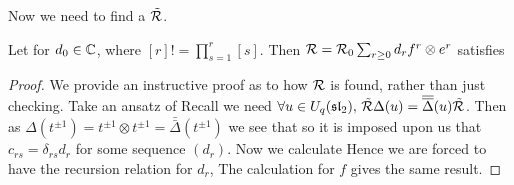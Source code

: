 \documentclass{article}
\begin{document}
Now we need to find a $\tilde{\mathcal{R}}$. 

\begin{prop}
Let 
for $d_0 \in \mathbb{C}$, where $[r]! = \prod_{s=1}^r [s]$. Then $\mathcal{R} = \mathcal{R}_0 \sum_{r \geq 0} d_r f^r \otimes e^r$ satisfies 
\end{prop}
\begin{proof}
We provide an instructive proof as to how $\mathcal{R}$ is found, rather than just checking. Take an ansatz of 
Recall we need $\forall u \in U_q(\mathfrak{sl}_2), \, \tilde{\mathcal{R}}\Delta(u) = \overline{\overline{\Delta}}(u) \tilde{\mathcal{R}}$. Then as $\Delta(t^{\pm1}) = t^{\pm1} \otimes t^{\pm1} = \bar{\bar{\Delta}}(t^{\pm 1})$ we see that 
so it is imposed upon us that $c_{rs} = \delta_{rs}d_r$ for some sequence $(d_r)$. Now we calculate 
Hence we are forced to have the recursion relation for $d_r$,
The calculation for $f$ gives the same result. 
\end{proof}
\end{document}
